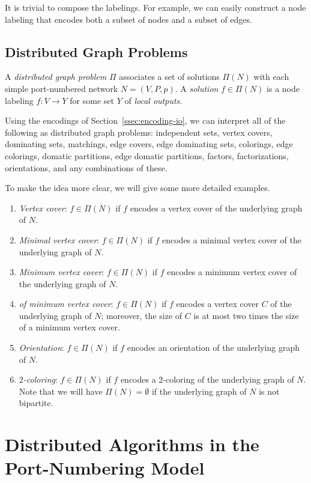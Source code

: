 It is trivial to compose the labelings. For example, we can easily construct a node labeling that encodes both a subset of nodes and a subset of edges.


\subsection{Distributed Graph Problems}\label{ssec:distr-graph-problem}

A \emph{distributed graph problem} $\Pi$ associates a set of solutions $\Pi(N)$ with each simple port-numbered network $N = (V,P,p)$. A \emph{solution} $f \in \Pi(N)$ is a node labeling $f\colon V \to Y$ for some set $Y$ of \emph{local outputs}.

Using the encodings of Section~\ref{ssec:encoding-io}, we can interpret all of the following as distributed graph problems: independent sets, vertex covers, dominating sets, matchings, edge covers, edge dominating sets, colorings, edge colorings, domatic partitions, edge domatic partitions, factors, factorizations, orientations, and any combinations of these.

To make the idea more clear, we will give some more detailed examples.
\begin{enumerate}
    \item \emph{Vertex cover}: $f \in \Pi(N)$ if $f$ encodes a vertex cover of the underlying graph of $N$.
    \item \emph{Minimal vertex cover}: $f \in \Pi(N)$ if $f$ encodes a minimal vertex cover of the underlying graph of $N$.
    \item \emph{Minimum vertex cover}: $f \in \Pi(N)$ if $f$ encodes a minimum vertex cover of the underlying graph of $N$.
    \item \emph{ of minimum vertex cover}: $f \in \Pi(N)$ if $f$ encodes a vertex cover $C$ of the underlying graph of $N$; moreover, the size of $C$ is at most two times the size of a minimum vertex cover.
    \item \emph{Orientation}: $f \in \Pi(N)$ if $f$ encodes an orientation of the underlying graph of $N$.
    \item \emph{$2$-coloring}: $f \in \Pi(N)$ if $f$ encodes a $2$-coloring of the underlying graph of $N$. Note that we will have $\Pi(N) = \emptyset$ if the underlying graph of $N$ is not bipartite.
\end{enumerate}


\section[Distributed Algorithms in the \tPN{} model]{Distributed Algorithms in the Port-Numbering Model}\label{sec:distr-alg}

